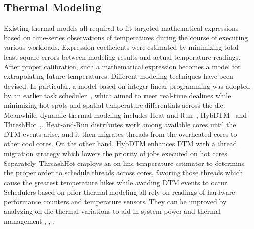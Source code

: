 \documentclass[times, 10pt,twocolumn]{IEEEtran}
\begin{document}
\subsection{Thermal Modeling}
\label{sec:thermal-modeling}
Existing thermal models all required to fit targeted mathematical
expressions based on time-series observations of temperatures during the
course of executing various workloads.  Expression coefficients were
estimated by minimizing total least square errors between modeling
results and actual temperature readings.  After proper calibration, such
a mathematical expression becomes a model for extrapolating future
temperatures.  Different modeling techniques have been devised.  In
particular, a model based on integer linear programming was adopted by
an earlier task scheduler~\cite{Kursun2009}, which aimed to meet
real-time dealines while minimizing hot spots and spatial temperature
differentials across the die.  Meanwhile, dynamic thermal modeling
includes Heat-and-Run~\cite{Gomaa2004}, HybDTM~\cite{Ayoub2011} and
ThreshHot~\cite{Yang2008},\cite{Bellosa2003}.  Heat-and-Run distributes
work among available cores until the DTM events arise, and it then
migrates threads from the overheated cores to other cool cores.  On the
other hand, HybDTM enhances DTM with a thread migration strategy which
lowers the priority of jobs executed on hot cores.  Separately,
ThreashHot employs an on-line temperature estimator to determine the
proper order to schedule threads across cores, favoring those threads
which cause the greatest temperature hikes while avoiding DTM events to
occur.  Schedulers based on prior thermal modeling all rely on readings
of hardware performance counters and temperature sensors.  They can be
improved by analyzing on-die thermal variations to aid in system power
and thermal management \cite{Kursun2009}, \cite{Bailis2011}, \cite{Murali2008}.
\end{document}
